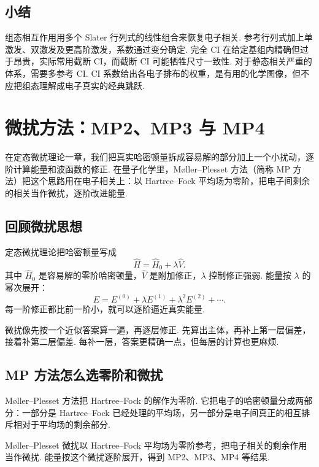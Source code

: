 \documentclass[UTF8,11pt,a4paper,openany]{ctexbook}
\begin{document}
\section{小结}

组态相互作用用多个 Slater 行列式的线性组合来恢复电子相关. 参考行列式加上单激发、双激发及更高阶激发，系数通过变分确定. 完全 CI 在给定基组内精确但过于昂贵，实际常用截断 CI，而截断 CI 可能牺牲尺寸一致性. 对于静态相关严重的体系，需要多参考 CI. CI 系数给出各电子排布的权重，是有用的化学图像，但不应把组态理解成电子真实的经典跳跃. 

\chapter{微扰方法：MP2、MP3 与 MP4}

在定态微扰理论一章，我们把真实哈密顿量拆成容易解的部分加上一个小扰动，逐阶计算能量和波函数的修正. 在量子化学里，Møller--Plesset 方法（简称 MP 方法）把这个思路用在电子相关上：以 Hartree--Fock 平均场为零阶，把电子间剩余的相关当作微扰，逐阶改进能量. 

\section{回顾微扰思想}

定态微扰理论把哈密顿量写成
\[
\hat H=\hat H_0+\lambda\hat V.
\]
其中 $\hat H_0$ 是容易解的零阶哈密顿量，$\hat V$ 是附加修正，$\lambda$ 控制修正强弱. 能量按 $\lambda$ 的幂次展开：
\[
E=E^{(0)}+\lambda E^{(1)}+\lambda^2E^{(2)}+\cdots.
\]
每一阶修正都比前一阶小，就可以逐阶逼近真实能量. 

\begin{analogybox}
微扰像先按一个近似答案算一遍，再逐层修正. 先算出主体，再补上第一层偏差，接着补第二层偏差. 每补一层，答案更精确一点，但每层的计算也更麻烦. 
\end{analogybox}

\section{MP 方法怎么选零阶和微扰}

Møller--Plesset 方法把 Hartree--Fock 的解作为零阶. 它把电子的哈密顿量分成两部分：一部分是 Hartree--Fock 已经处理的平均场，另一部分是电子间真正的相互排斥相对于平均场的剩余部分. 

\begin{definitionbox}
Møller--Plesset 微扰以 Hartree--Fock 平均场为零阶参考，把电子相关的剩余作用当作微扰. 能量按这个微扰逐阶展开，得到 MP2、MP3、MP4 等结果. 
\end{definitionbox}
\end{document}
